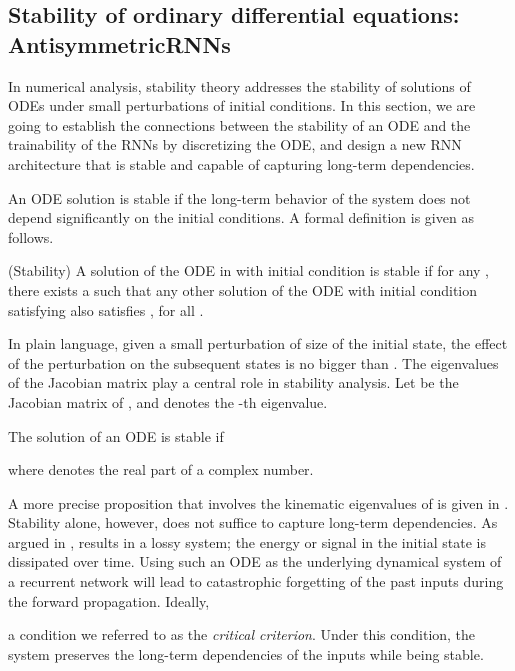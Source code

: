 \subsection{Stability of ordinary differential equations: AntisymmetricRNNs}
\label{sec:ODE_theory}



In numerical analysis, stability theory addresses the stability of solutions of ODEs under small perturbations of initial conditions. In this section, we are going to establish the connections between the stability of an ODE and the trainability of the RNNs by discretizing the ODE, and design a new RNN architecture that is stable and capable of capturing long-term dependencies.


An ODE solution is stable if the long-term behavior of the system does not depend significantly on the initial conditions. 
A formal definition is given as follows.

\begin{definition} (Stability)
A solution  of the ODE in  with initial condition  is stable if
for any , there exists a  such that any other solution  of the ODE with initial condition  satisfying 
 also satisfies , for all . 
\end{definition}
In plain language, given a small perturbation of size  of the initial state, the effect of the perturbation on the subsequent states is no bigger than .
The eigenvalues of the Jacobian matrix play a central role in stability analysis.
Let  be the Jacobian matrix of , and  denotes the -th eigenvalue.

\begin{proposition}
The solution of an ODE is stable if

where  denotes the real part of a complex number.
\end{proposition}
A more precise proposition that involves the kinematic eigenvalues of  is given in \cite{ascher1994numerical}.
Stability alone, however, does not suffice to capture long-term dependencies. As argued in \cite{haber2017stable},  results in a lossy system;
the energy or signal in the initial state is dissipated over time.
Using such an ODE as the underlying dynamical system of a recurrent network will lead to catastrophic forgetting of the past inputs during the forward propagation.  
Ideally, 

a condition we referred to as the \textit{critical criterion}.
Under this condition, the system preserves the long-term dependencies of the inputs while being stable. 

